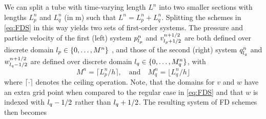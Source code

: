 We can split a tube with time-varying length $L^n$ into two smaller sections with lengths $L_p^n$ and $L_q^n$ (in m) such that $L^n = L_p^n + L_q^n$. Splitting the schemes in \eqref{eq:FDS} in this way yields two sets of first-order systems. The pressure and particle velocity of the first (left) system $p_{l_p}^n$ and $v_{{l_p}+1/2}^{n+1/2}$ are both defined over discrete domain ${l_p} \in \{0, \hdots, M^n\}$%
, and those of the second (right) system $q_{l_q}^n$ and $w_{{l_q}-1/2}^{n+1/2}$ are defined over discrete domain ${l_q} \in \{0, \hdots, M_q^n\}$, with
\begin{equation}\label{eq:MMq}
    M^n = \lceil L_p^n/h\rceil, \quad \text{and} \quad M_q^n = \lfloor L_q^n/h\rfloor
\end{equation} where $\lceil \cdot \rceil$ denotes the ceiling operation. Note, that the domains for $v$ and $w$ have an extra grid point when compared to the regular case in \eqref{eq:FDS} and that $w$ is indexed with ${l_q}-1/2$ rather than ${l_q}+1/2$. The resulting system of FD schemes then becomes
